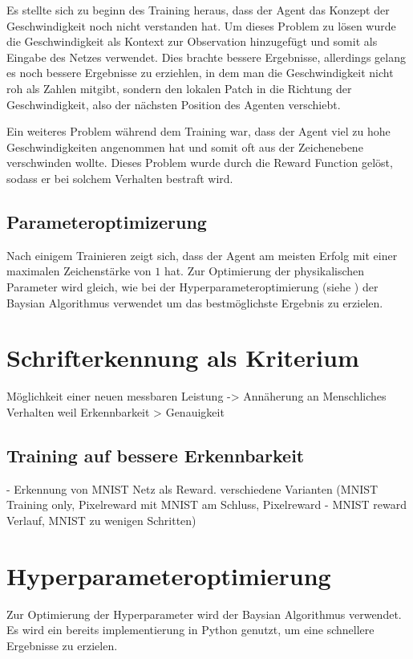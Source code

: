 Es stellte sich zu beginn des Training heraus, dass der Agent das Konzept der
Geschwindigkeit noch nicht verstanden hat. Um dieses Problem zu lösen wurde die
Geschwindigkeit als Kontext zur Observation hinzugefügt und somit als Eingabe
des Netzes verwendet. Dies brachte bessere Ergebnisse, allerdings gelang es noch
bessere Ergebnisse zu erziehlen, in dem man die Geschwindigkeit nicht roh als
Zahlen mitgibt, sondern den lokalen Patch in die Richtung der Geschwindigkeit,
also der nächsten Position des Agenten verschiebt.

Ein weiteres Problem während dem Training war, dass der Agent viel zu hohe
Geschwindigkeiten angenommen hat und somit oft aus der Zeichenebene verschwinden
wollte. Dieses Problem wurde durch die Reward Function gelöst, sodass er bei
solchem Verhalten bestraft wird.


\subsection*{Parameteroptimizerung}
Nach einigem Trainieren zeigt sich, dass der Agent am meisten Erfolg mit einer
maximalen Zeichenstärke von $1$ hat. Zur Optimierung der physikalischen
Parameter wird gleich, wie bei der Hyperparameteroptimierung (siehe %
) der Baysian Algorithmus verwendet um
das bestmöglichste Ergebnis zu erzielen.



\section{Schrifterkennung als Kriterium}
Möglichkeit einer neuen messbaren Leistung
-> Annäherung an Menschliches Verhalten weil Erkennbarkeit > Genauigkeit


\subsection*{Training auf bessere Erkennbarkeit}
- Erkennung von MNIST Netz als Reward. 
verschiedene Varianten (MNIST Training only, Pixelreward mit MNIST am Schluss, Pixelreward - MNIST reward Verlauf, MNIST zu wenigen Schritten)


\section{Hyperparameteroptimierung}
\label{chap:Hyperparameter Optimierung}
Zur Optimierung der Hyperparameter wird der Baysian Algorithmus verwendet. Es
wird ein bereits implementierung in Python genutzt, um eine schnellere
Ergebnisse zu erzielen. \cite{fernando_bayesian_2022}

